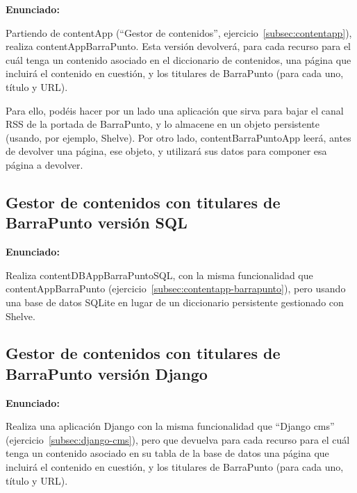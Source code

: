 \textbf{Enunciado:}

Partiendo de contentApp (``Gestor de contenidos'', ejercicio~\ref{subsec:contentapp}), realiza contentAppBarraPunto. Esta versión devolverá, para cada recurso para el cuál tenga un contenido asociado en el diccionario de contenidos, una página que incluirá el contenido en cuestión, y los titulares de BarraPunto (para cada uno, título y URL).

Para ello, podéis hacer por un lado una aplicación que sirva para bajar el canal RSS de la portada de BarraPunto, y lo almacene en un objeto persistente (usando, por ejemplo, Shelve). Por otro lado, contentBarraPuntoApp leerá, antes de devolver una página, ese objeto, y utilizará sus datos para componer esa página a devolver. 

\subsection{Gestor de contenidos con titulares de BarraPunto versión SQL}
\label{subsec:contentapp-barrapunto-sql}

\textbf{Enunciado:}

Realiza contentDBAppBarraPuntoSQL, con la misma funcionalidad que contentAppBarraPunto (ejercicio~\ref{subsec:contentapp-barrapunto}), pero usando una base de datos SQLite en lugar de un diccionario persistente gestionado con Shelve.

\subsection{Gestor de contenidos con titulares de BarraPunto versión Django}
\label{subsec:django-cms-barrapunto}

\textbf{Enunciado:}


Realiza una aplicación Django con la misma funcionalidad que ``Django cms'' (ejercicio~\ref{subsec:django-cms}), pero que devuelva para cada recurso para el cuál tenga un contenido asociado en su tabla de la base de datos una página que incluirá el contenido en cuestión, y los titulares de BarraPunto (para cada uno, título y URL).

